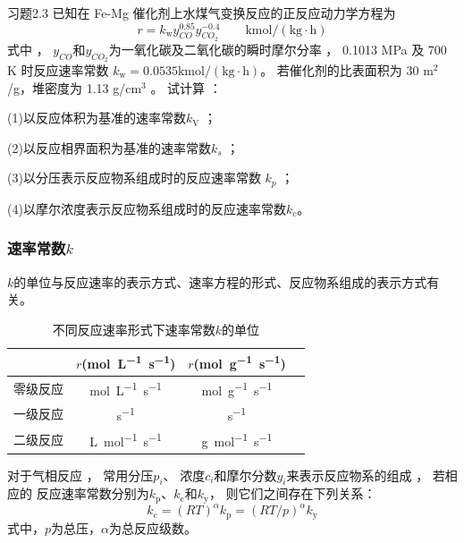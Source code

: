 \begin{frame}[t]
    \frametitle{}
    \begin{block}{习题2.3}
        已知在 Fe-Mg 催化剂上水煤气变换反应的正反应动力学方程为
\[
    r=k_{\mathrm{w}}y_{CO}^{0.85}y_{{CO}_{2}}^{-0.4}\qquad\mathrm{kmol/(kg·h)}
\]
式中 ， $y_{CO}$和$y_{{CO}_{2}}$为一氧化碳及二氧化碳的瞬时摩尔分率 ， 0.1013 MPa 及 700 K 时反应速率常数 $k_{\mathrm{w}}=0.0535 \mathrm{kmol/(kg·h)}$。 若催化剂的比表面积为 30 m$^2$/g，堆密度为 1.13 g/cm$^3$ 。 试计算 ：

(1)以反应体积为基准的速率常数$k_\mathrm{V}$ ；

(2)以反应相界面积为基准的速率常数$k_s$ ；

(3)以分压表示反应物系组成时的反应速率常数 $k_p$ ；

(4)以摩尔浓度表示反应物系组成时的反应速率常数$k_c$。
    \end{block}
\end{frame}


\begin{frame}
    \frametitle{速率常数$k$}
    $k$的单位与反应速率的表示方式、速率方程的形式、反应物系组成的表示方式有关。

    \begin{table}
        \centering
        \caption{不同反应速率形式下速率常数$k$的单位}
        \begin{tabular}{cccc}
            \bottomrule
             & $r$(\si{mol.L^{-1}.s^{-1}}) & $r$(\si{mol.g^{-1}.s^{-1}}) \\ \hline
            零级反应 & \si{mol.L^{-1}.s^{-1}} & \si{mol.g^{-1}.s^{-1}} \\
            一级反应 & \si{s^{-1}} & \si{s^{-1}} \\ 
            二级反应 & \si{L.mol^{-1}.s^{-1}} & \si{g.mol^{-1}.s^{-1}} \\ \toprule
        \end{tabular}
    \end{table}

    对于气相反应 ， 常用分压$p_i$、 浓度$c_i$和摩尔分数$y_i$来表示反应物系的组成 ， 若相应的
    反应速率常数分别为$k_\mathrm{p}$、$k_\mathrm{c}$和$k_\mathrm{y}$， 则它们之间存在下列关系：
    \[
        k_\mathrm{c}=(RT)^\alpha k_\mathrm{p}=(RT/p)^\alpha k_\mathrm{y}
    \]
    式中，$p$为总压，$\alpha$为总反应级数。
\end{frame}